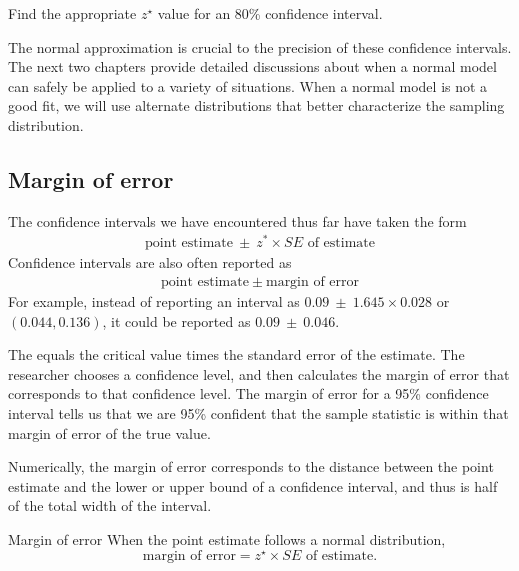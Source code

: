 \begin{exercisewrap}
\begin{nexercise} \label{find90CIForRun10AgeExercise}
Find the appropriate $z^{\star}$ value for an 80\% confidence interval.\footnotemark
\end{nexercise}
\end{exercisewrap}

The normal approximation is crucial to the precision of these confidence intervals. The next two chapters provide detailed discussions about when a normal model can safely be applied to a variety of situations. When a normal model is not a good fit, we will use alternate distributions that better characterize the sampling distribution.

\subsection{Margin of error}

The confidence intervals we have encountered thus far have taken the form
\begin{align*}
\text{point estimate} \ \pm \ z^*\times SE \text{ of estimate}
\end{align*}
Confidence intervals are also often reported as 
\begin{align*}
\text{point estimate} \ \pm \ \text{margin of error}
\end{align*}
For example, instead of reporting an interval as $0.09 \ \pm  \ 1.645\times 0.028$ or $(0.044, 0.136)$, it could be reported as $0.09 \ \pm \  0.046$.

The  equals the critical value times the standard error of the estimate. The researcher chooses a confidence level, and then calculates the margin of error that corresponds to that confidence level.  The margin of error for a 95\% confidence interval tells us that we are 95\% confident that the sample statistic is within that margin of error of the true value.  

Numerically, the margin of error corresponds to the distance between the point estimate and the lower or upper bound of a confidence interval, and thus is half of the total width of the interval.   

\begin{onebox}{Margin of error}\label{marginOfErrorTermBox}
When the point estimate follows a normal distribution, 
$$ \text{margin of error} = z^{\star}\times SE \text{ of estimate}.$$
\end{onebox}

